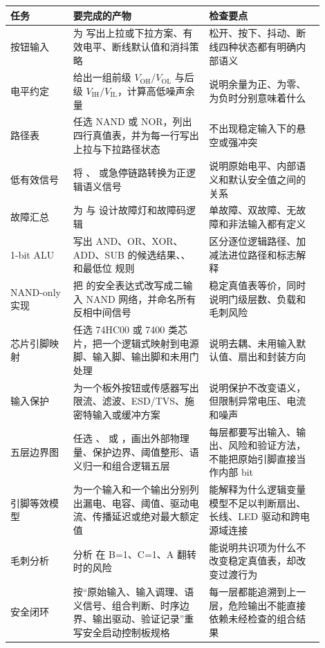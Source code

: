 \begin{longtable}{L{0.18\linewidth}L{0.39\linewidth}L{0.33\linewidth}}
\toprule
任务 & 要完成的产物 & 检查要点 \\
\midrule
按钮输入 & 为  写出上拉或下拉方案、有效电平、断线默认值和消抖策略 & 松开、按下、抖动、断线四种状态都有明确内部语义 \\
电平约定 & 给出一组前级 $V_\mathrm{OH}/V_\mathrm{OL}$ 与后级 $V_\mathrm{IH}/V_\mathrm{IL}$，计算高低噪声余量 & 说明余量为正、为零、为负时分别意味着什么 \\
路径表 & 任选 NAND 或 NOR，列出四行真值表，并为每一行写出上拉与下拉路径状态 & 不出现稳定输入下的悬空或强冲突 \\
低有效信号 & 将 、 或急停链路转换为正逻辑语义信号 & 说明原始电平、内部语义和默认安全值之间的关系 \\
故障汇总 & 为  与  设计故障灯和故障码逻辑 & 单故障、双故障、无故障和非法输入都有定义 \\
1-bit ALU & 写出 AND、OR、XOR、ADD、SUB 的候选结果、、 和最低位  规则 & 区分逐位逻辑路径、加减法进位路径和标志解释 \\
NAND-only 实现 & 把  的安全表达式改写成二输入 NAND 网络，并命名所有反相中间信号 & 稳定真值表等价，同时说明门级层数、负载和毛刺风险 \\
芯片引脚映射 & 任选 74HC00 或 7400 类芯片，把一个逻辑式映射到电源脚、输入脚、输出脚和未用门处理 & 说明去耦、未用输入默认值、扇出和封装方向 \\
输入保护 & 为一个板外按钮或传感器写出限流、滤波、ESD/TVS、施密特输入或缓冲方案 & 说明保护不改变语义，但限制异常电压、电流和噪声 \\
五层边界图 & 任选 、 或 ，画出外部物理量、保护边界、阈值整形、语义归一和组合逻辑五层 & 每层都要写出输入、输出、风险和验证方法，不能把原始引脚直接当作内部 bit \\
引脚等效模型 & 为一个输入和一个输出分别列出漏电、电容、阈值、驱动电流、传播延迟或绝对最大额定值 & 能解释为什么逻辑变量模型不足以判断扇出、长线、LED 驱动和跨电源域连接 \\
毛刺分析 & 分析  在 B=1、C=1、A 翻转时的风险 & 能说明共识项为什么不改变稳定真值表，却改变过渡行为 \\
安全闭环 & 按“原始输入、输入调理、语义信号、组合判断、时序边界、输出驱动、验证记录”重写安全启动控制板规格 & 每一层都能追溯到上一层，危险输出不能直接依赖未经检查的组合结果 \\

\end{longtable}
